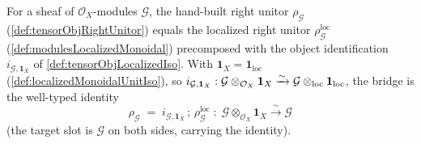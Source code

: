 \begin{lemma}
  \label{lem:tensorObjRightUnitor_eq_localized}
  For a sheaf of \(\mathcal{O}_X\)-modules \(\mathcal{G}\), the hand-built right
  unitor \(\rho_{\mathcal{G}}\) (\cref{def:tensorObjRightUnitor}) equals the
  localized right unitor \(\rho^{\mathrm{loc}}_{\mathcal{G}}\)
  (\cref{def:modulesLocalizedMonoidal}) precomposed with the object identification
  \(i_{\mathcal{G},\mathbf{1}_X}\) of \cref{def:tensorObjLocalizedIso}. With
  \(\mathbf{1}_X = \mathbf{1}_{\mathrm{loc}}\)
  (\cref{def:localizedMonoidalUnitIso}), so
  \(i_{\mathcal{G},\mathbf{1}_X} : \mathcal{G} \otimes_{\mathcal{O}_X}
  \mathbf{1}_X \xrightarrow{\sim} \mathcal{G} \mathbin{\otimes_{\mathrm{loc}}} \mathbf{1}_{\mathrm{loc}}\),
  the bridge is the well-typed identity
  \[
    \rho_{\mathcal{G}}
      \;=\; i_{\mathcal{G},\mathbf{1}_X} \,;\,
        \rho^{\mathrm{loc}}_{\mathcal{G}}
    \;:\; \mathcal{G} \otimes_{\mathcal{O}_X} \mathbf{1}_X
      \xrightarrow{\sim} \mathcal{G}
  \]
  (the target slot is \(\mathcal{G}\) on both sides, carrying the identity).
\end{lemma}

